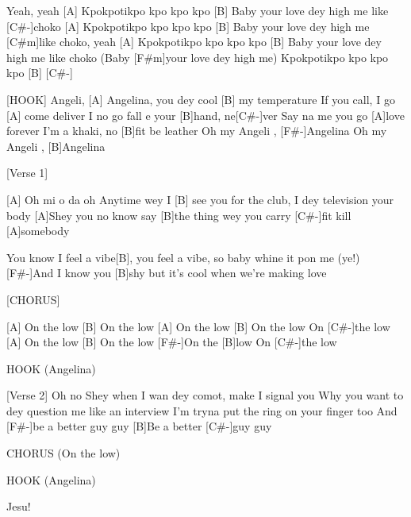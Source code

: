 
\begin{guitar}
Yeah, yeah
[A] Kpokpotikpo kpo kpo kpo
[B] Baby your love dey high me like [C#-]choko
[A] Kpokpotikpo kpo kpo kpo
[B] Baby your love dey high me [C#m]like choko, yeah
[A] Kpokpotikpo kpo kpo kpo                                                
[B] Baby your love dey high me like choko (Baby [F#m]your love dey high me)
Kpokpotikpo kpo kpo kpo [B] [C#-]

[HOOK]
Angeli, [A] Angelina, you dey cool [B] my temperature
If you call, I go [A] come deliver
I no go fall e your [B]hand, ne[C#-]ver
Say na me you go [A]love forever
I’m a khaki, no [B]fit be leather
Oh my Angeli , [F#-]Angelina
Oh my Angeli , [B]Angelina

[Verse 1]

[A] Oh mi o da oh
Anytime wey I [B] see you for the club, I dey television your body
[A]Shey you no know say [B]the thing wey you carry [C#-]fit kill [A]somebody

You know I feel a vibe[B], you feel a vibe, so baby whine it pon me (ye!)
[F#-]And I know you [B]shy but it's cool when we're making love

[CHORUS]

[A] On the low [B] On the low
[A] On the low [B] On the low
On [C#-]the low [A] On the low
[B] On the low [F#-]On the [B]low
On [C#-]the low

HOOK (Angelina)

[Verse 2]
Oh no Shey when I wan dey comot, make I signal you
Why you want to dey question me like an interview
I’m tryna put the ring on your finger too
And [F#-]be a better guy guy
[B]Be a better [C#-]guy guy

CHORUS (On the low)

HOOK (Angelina)

Jesu!
\end{guitar}